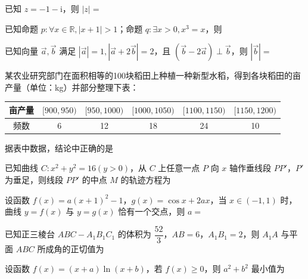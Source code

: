 \documentclass[a4paper,11pt]{report}
\begin{document}
\begin{examquestions}
\item 已知 $z=-1-\mathrm{i}$，则 $|z|=$
\item 已知命题 $p:\forall x\in\mathbb R, |x+1|>1$；命题 $q:\exists x>0,x^3=x$，则
\item 已知向量 $\vec a,\vec b$ 满足 $|\vec a|=1,|\vec a+2\vec b|=2$，且 $(\vec b-2\vec a)\perp\vec b$，则 $|\vec b|=$
\item 某农业研究部门在面积相等的100块稻田上种植一种新型水稻，得到各块稻田的亩产量（单位：kg）并部分整理下表：
\begin{tightcenter}
{\renewcommand{\arraystretch}{0.9}
\begin{tabular}{|c|c|c|c|c|c|}
\hline 亩产量 & $[900,950)$ & $[950,1000)$ & $[1000,1050)$ & $[1100,1150)$ & $[1150,1200)$\\ \hline
频数 & 6 & 12 & 18 & 24 & 10\\ \hline
\end{tabular}}
\end{tightcenter}
据表中数据，结论中正确的是
\newpage
\item 已知曲线 $C:x^2+y^2=16(y>0)$，从 $C$ 上任意一点 $P$ 向 $x$ 轴作垂线段 $PP'$，$P'$ 为垂足，则线段 $PP'$ 的中点 $M$ 的轨迹方程为
\item 设函数 $f(x)=a(x+1)^2-1$，$g(x)=\cos x+2ax$，当 $x\in(-1,1)$ 时，曲线 $y=f(x)$ 与 $y=g(x)$ 恰有一个交点，则 $a=$
\item 已知正三棱台 $ABC-A_1B_1C_1$ 的体积为 $\dfrac{52}{3}$，$AB=6$，$A_1B_1=2$，则 $A_1A$ 与平面 $ABC$ 所成角的正切值为
\item 设函数 $f(x)=(x+a)\ln(x+b)$，若 $f(x)\geq0$，则 $a^2+b^2$ 最小值为
\end{examquestions}
\end{document}
